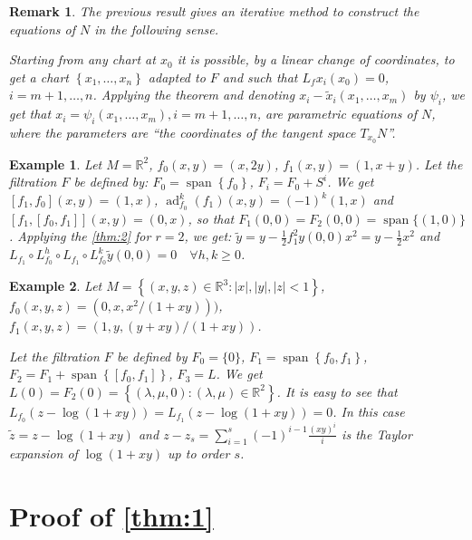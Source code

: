 \documentclass{article}
\newtheorem{remark}{Remark}[section]
\newtheorem{example}{Example}[section]
\newcommand{\R}{\mathbb{R}}
\begin{document}
\begin{remark}
	\label{rk:2.1}
	The previous result gives an iterative method to construct the equations of $N$ in the following sense.
	
	Starting from any chart at $x_0$ it is possible, by a linear change of coordinates, to get a chart $\left\{x_1, \ldots, x_n\right\}$ adapted to $F$ and such that $L_f x_i\left(x_0\right)=0$, $i=m+1, \ldots, n$. 
	Applying the theorem and denoting $x_i-\tilde{x}_i\left(x_1, \ldots, x_m\right)$ by $\psi_i$, we get that $x_i=\psi_i\left(x_1, \ldots, x_m\right), i=m+1, \ldots, n$, are parametric equations of $N$, where the parameters are ``the coordinates of the tangent space $T_{x_0} N$''.
\end{remark}

\begin{example}
	Let $M=\R^2$, $f_0(x, y)=(x, 2 y)$, $f_1(x, y)=(1, x+y)$. 
	Let the filtration $F$ be defined by: $F_0 = \operatorname{span} \left\{f_0\right\}$, $F_i=F_0+S^i$.
	We get $\left[f_1, f_0\right](x, y)=(1, x)$, $\operatorname{ad}^k_{f_0}\left(f_1\right)(x, y)=(-1)^{k}(1, x)$ and $\left[f_1,\left[f_0, f_1\right]\right](x, y)=(0, x)$, so that $F_1(0,0)=F_2(0,0)=\operatorname{span}\{(1,0)\}$.
	Applying the \cref{thm:2} for $r=2$, we get: $\tilde{y}=y-\frac{1}{2} f_1^2 y(0,0) x^2=y-\frac{1}{2} x^2$ and $L_{f_1} \circ L_{f_0}^h \circ L_{f_1} \circ L_{f_0}^k \tilde{y}(0,0)=0 \quad \forall h, k \geq 0$.
\end{example}

\begin{example}
	Let $M=\left\{(x, y, z) \in \mathbb{R}^3:|x|,|y|,|z|<1\right\}$, $f_0(x, y, z)=\left(0, x, x^2 /(1+x y)\right))$, $f_1(x, y, z)=(1, y,(y+x y) /(1+x y))$.
	
	Let the filtration $F$ be defined by $F_0=\{0\}$, $F_1=\operatorname{span}\left\{f_0, f_1\right\}$, $F_2=F_1+\operatorname{span}\left\{\left[f_0, f_1\right]\right\}$, $F_3=L$. 
	We get $L(0)=F_2(0)=\left\{(\lambda, \mu, 0):(\lambda, \mu) \in \mathbb{R}^2\right\}$.
	It is easy to see that $L_{f_0}(z-\log (1+x y))=L_{f_1}(z-\log (1+x y))=0$. 
	In this case $\tilde{z}=z-\log (1+x y)$ and $z-z_s=\sum_{i=1}^s(-1)^{i-1} \frac{(x y)^i}{i}$ is the Taylor expansion of $\log (1+x y)$ up to order $s$.
\end{example}

\section{Proof of \texorpdfstring{\cref{thm:1}}{Theorem 1}}
\label{sec:3}
\end{document}
